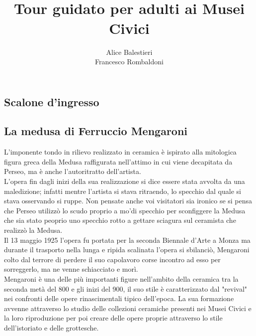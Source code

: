 \documentclass[hidelinks,12pt,a4paper]{article}
\begin{document}
	\begin{flushleft}
	
			\title{\textbf{\\Tour guidato per adulti ai Musei Civici}}
			\author{Alice Balestieri\\Francesco Rombaldoni}
			\date{}
	
			\maketitle
			\setcounter{page}{1}
			\newpage
	
			\tableofcontents
			\newpage
	
			\section{Scalone d'ingresso}
	
			\subsection{La medusa di Ferruccio Mengaroni}
			L'imponente tondo in rilievo realizzato in ceramica è ispirato alla mitologica figura greca della Medusa raffigurata nell'attimo in cui viene decapitata da Perseo, ma è anche l’autoritratto dell'artista.\\
			L'opera fin dagli inizi della sua realizzazione si dice essere stata avvolta da una maledizione; infatti mentre l'artista si stava ritraendo, lo specchio dal quale si stava osservando si ruppe. Non pensate anche voi visitatori sia ironico se si pensa che Perseo utilizzò lo scudo proprio a mo'di specchio per sconfiggere la Medusa che sia stato peoprio uno specchio rotto a gettare sciagura sul ceramista che realizzò la Medusa.\\
			Il 13 maggio 1925 l'opera fu portata per la seconda Biennale d'Arte a Monza ma durante il trasporto nella lunga e ripida scalinata l'opera si sbilanciò, Mengaroni colto dal terrore di perdere il suo capolavoro corse incontro ad esso per sorreggerlo, ma ne venne schiacciato e morì.\\
			Mengaroni è una delle più importanti figure nell'ambito della ceramica tra la seconda metà del 800 e gli inizi del 900, il suo stile è caratterizzato dal "revival" nei confronti delle opere rinascimentali tipico dell'epoca. La sua formazione avvenne attraverso lo studio delle collezioni ceramiche presenti nei Musei Civici e la loro riproduzione per poi creare delle opere proprie attraverso lo stile dell'istoriato e delle grottesche.
	

\end{flushleft}
\end{document}
